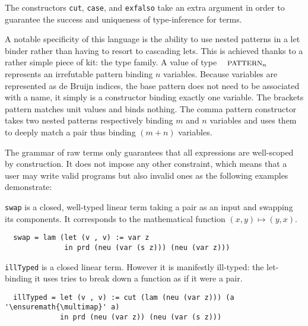 The constructors \texttt{cut}, \texttt{case}, and \texttt{exfalso}
take an extra \Type{} argument in order to guarantee the success
and uniqueness of type-inference for \Inferable{} terms.

A notable specificity of this language is the ability to use nested
patterns in a let binder rather than having to resort to cascading
lets. This is achieved thanks to a rather simple piece of kit: the
\Pattern{} type family. A value of type $\Pattern{n}$ represents an
irrefutable pattern binding $n$ variables. Because variables are
represented as de Bruijn indices, the base pattern does not need to
be associated with a name, it simply is a constructor \varpattern{}
binding exactly one variable. The brackets pattern \unitpattern{} matches
unit values and binds nothing. The comma pattern constructor \prdpattern{\cdot}{\cdot}
takes two nested patterns respectively binding $m$ and $n$ variables and
uses them to deeply match a pair thus binding $(m + n)$ variables.


The grammar of raw terms only guarantees that all expressions are
well-scoped by construction. It does not impose any other constraint,
which means that a user may write valid programs but also invalid
ones as the following examples demonstrate:

\begin{example}\label{example:swap}
\texttt{swap} is a closed, well-typed linear term taking a pair as
an input and swapping its components. It corresponds to the mathematical
function $(x, y) \mapsto (y, x)$.
\begin{lstlisting}
  swap = lam (let (v , v) := var z
              in prd (neu (var (s z))) (neu (var z)))
\end{lstlisting}
\end{example}

\begin{example}\label{example:illTyped}
\texttt{illTyped} is a closed linear term. However it is manifestly
ill-typed: the let-binding it uses tries to break down a function as
if it were a pair.
\begin{lstlisting}
  illTyped = let (v , v) := cut (lam (neu (var z))) (a '\ensuremath{\multimap}' a)
             in prd (neu (var z)) (neu (var (s z)))
\end{lstlisting}
\end{example}

